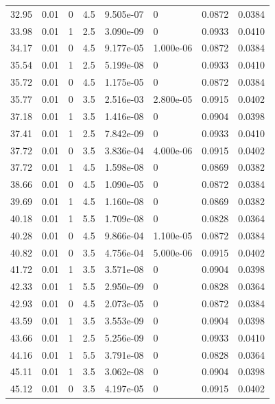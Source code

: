 \documentclass[preview]{standalone}
\begin{document}
{{{\begin{tabular}{L{1.2cm}C{1.2cm} C{0.3cm}C{0.5cm} C{1.4cm}C{1.4cm} C{1.4cm}C{1.4cm}}
  32.95  &  0.01  & 0     & 4.5 &  9.505e-07  & 0  & 0.0872 &  0.0384   \\ 
  33.98  &  0.01  & 1     & 2.5 &  3.090e-09  & 0  & 0.0933 &  0.0410   \\ 
  34.17  &  0.01  & 0     & 4.5 &  9.177e-05  & 1.000e-06  & 0.0872 &  0.0384   \\ 
  35.54  &  0.01  & 1     & 2.5 &  5.199e-08  & 0  & 0.0933 &  0.0410   \\ 
  35.72  &  0.01  & 0     & 4.5 &  1.175e-05  & 0  & 0.0872 &  0.0384   \\ 
  35.77  &  0.01  & 0     & 3.5 &  2.516e-03  & 2.800e-05  & 0.0915 &  0.0402   \\ 
  37.18  &  0.01  & 1     & 3.5 &  1.416e-08  & 0  & 0.0904 &  0.0398   \\ 
  37.41  &  0.01  & 1     & 2.5 &  7.842e-09  & 0  & 0.0933 &  0.0410   \\ 
  37.72  &  0.01  & 0     & 3.5 &  3.836e-04  & 4.000e-06  & 0.0915 &  0.0402   \\ 
  37.72  &  0.01  & 1     & 4.5 &  1.598e-08  & 0  & 0.0869 &  0.0382   \\ 
  38.66  &  0.01  & 0     & 4.5 &  1.090e-05  & 0  & 0.0872 &  0.0384   \\ 
  39.69  &  0.01  & 1     & 4.5 &  1.160e-08  & 0  & 0.0869 &  0.0382   \\ 
  40.18  &  0.01  & 1     & 5.5 &  1.709e-08  & 0  & 0.0828 &  0.0364   \\ 
  40.28  &  0.01  & 0     & 4.5 &  9.866e-04  & 1.100e-05  & 0.0872 &  0.0384   \\ 
  40.82  &  0.01  & 0     & 3.5 &  4.756e-04  & 5.000e-06  & 0.0915 &  0.0402   \\ 
  41.72  &  0.01  & 1     & 3.5 &  3.571e-08  & 0  & 0.0904 &  0.0398   \\ 
  42.33  &  0.01  & 1     & 5.5 &  2.950e-09  & 0  & 0.0828 &  0.0364   \\ 
  42.93  &  0.01  & 0     & 4.5 &  2.073e-05  & 0  & 0.0872 &  0.0384   \\ 
  43.59  &  0.01  & 1     & 3.5 &  3.553e-09  & 0  & 0.0904 &  0.0398   \\ 
  43.66  &  0.01  & 1     & 2.5 &  5.256e-09  & 0  & 0.0933 &  0.0410   \\ 
  44.16  &  0.01  & 1     & 5.5 &  3.791e-08  & 0  & 0.0828 &  0.0364   \\ 
  45.11  &  0.01  & 1     & 3.5 &  3.062e-08  & 0  & 0.0904 &  0.0398   \\ 
  45.12  &  0.01  & 0     & 3.5 &  4.197e-05  & 0  & 0.0915 &  0.0402   \\ 

\end{tabular}}}}
\end{document}
